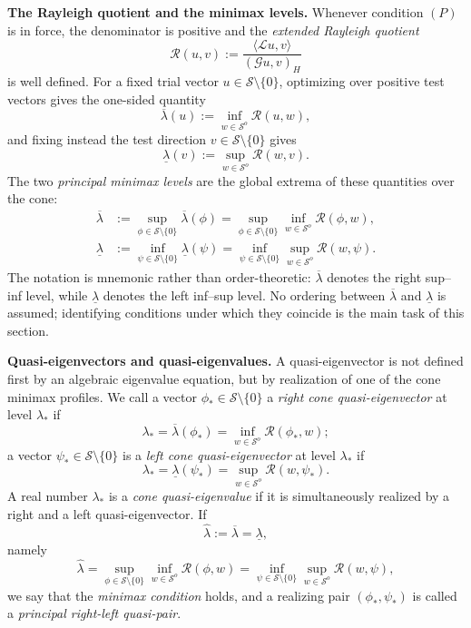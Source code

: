 \documentclass[preprint,10pt]{elsarticle}
\theoremstyle{plain}
\theoremstyle{definition}
\theoremstyle{remark}
\begin{document}
\noindent\textbf{The Rayleigh quotient and the minimax levels.}\;
Whenever condition $(P)$ is in force, the denominator is positive and the
\emph{extended Rayleigh quotient}
\[
\mathcal{R}(u,v)
:= \frac{\langle\mathcal{L}u,v\rangle}{(\mathcal{G}u,v)_{H}}
\]
is well defined. For a fixed trial vector $u\in\mathcal{S}\setminus\{0\}$,
optimizing over positive test vectors gives the one-sided quantity
\[
\overline{\lambda}(u)
:= \inf_{w\in\mathcal{S}^{o}}\mathcal{R}(u,w),
\]
and fixing instead the test direction $v\in\mathcal{S}\setminus\{0\}$ gives
\[
\underline{\lambda}(v)
:= \sup_{w\in\mathcal{S}^{o}}\mathcal{R}(w,v).
\]
The two \emph{principal minimax levels} are the global extrema of these
quantities over the cone:
\begin{align*}
	\overline{\lambda}
	&:= \sup_{\phi\in\mathcal{S}\setminus\{0\}}\overline{\lambda}(\phi)
	= \sup_{\phi\in\mathcal{S}\setminus\{0\}}
	\inf_{w\in\mathcal{S}^{o}}\mathcal{R}(\phi,w),\\
	\underline{\lambda}
	&:= \inf_{\psi\in\mathcal{S}\setminus\{0\}}\underline{\lambda}(\psi)
	= \inf_{\psi\in\mathcal{S}\setminus\{0\}}
	\sup_{w\in\mathcal{S}^{o}}\mathcal{R}(w,\psi).
\end{align*}
The notation is mnemonic rather than order-theoretic:
$\overline\lambda$ denotes the right sup--inf level, while
$\underline\lambda$ denotes the left inf--sup level. No ordering between
$\overline{\lambda}$ and $\underline{\lambda}$ is assumed; identifying
conditions under which they coincide is the main task of this section.

\medskip

\noindent\textbf{Quasi-eigenvectors and quasi-eigenvalues.}\;
A quasi-eigenvector is not defined first by an algebraic eigenvalue equation,
but by realization of one of the cone minimax profiles. We call a vector
$\phi_{*}\in\mathcal{S}\setminus\{0\}$ a \emph{right cone quasi-eigenvector}
at level $\lambda_{*}$ if
\[
\lambda_{*}
=
\overline{\lambda}(\phi_{*})
=
\inf_{w\in\mathcal{S}^{o}}\mathcal{R}(\phi_{*},w);
\]
a vector $\psi_{*}\in\mathcal{S}\setminus\{0\}$ is a
\emph{left cone quasi-eigenvector} at level $\lambda_{*}$ if
\[
\lambda_{*}
=
\underline{\lambda}(\psi_{*})
=
\sup_{w\in\mathcal{S}^{o}}\mathcal{R}(w,\psi_{*}).
\]
A real number $\lambda_{*}$ is a \emph{cone quasi-eigenvalue} if it is
simultaneously realized by a right and a left quasi-eigenvector. If
\[
\hat\lambda
:=
\overline{\lambda}
=
\underline{\lambda},
\]
namely
\[
\hat\lambda
=
\sup_{\phi\in\mathcal{S}\setminus\{0\}}
\inf_{w\in\mathcal{S}^{o}}\mathcal{R}(\phi,w)
=
\inf_{\psi\in\mathcal{S}\setminus\{0\}}
\sup_{w\in\mathcal{S}^{o}}\mathcal{R}(w,\psi),
\]
we say that the \emph{minimax condition} holds, and a realizing pair
$(\phi_{*},\psi_{*})$ is called a \emph{principal right-left quasi-pair}.
\end{document}
